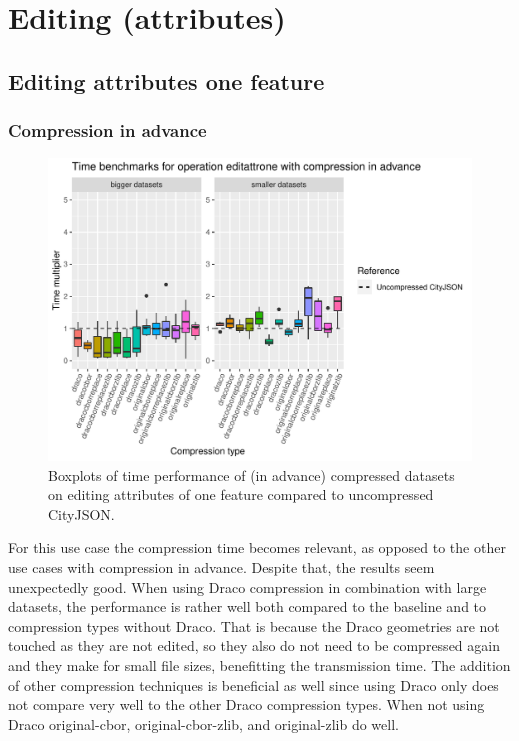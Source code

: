 \newpage

\section{Editing (attributes)}
\label{bmeditingattr}

\subsection{Editing attributes one feature}

\subsubsection{Compression in advance}

\begin{figure}[h!]
    \includegraphics[scale=0.92]{figs/benchmark/individual/editattrone.pdf}
    \caption{Boxplots of time performance of (in advance) compressed datasets on editing attributes of one feature compared to uncompressed CityJSON.}
    \label{fig:sdvis}
\end{figure}

For this use case the compression time becomes relevant, as opposed to the other use cases with compression in advance.
Despite that, the results seem unexpectedly good.
When using Draco compression in combination with large datasets, the performance is rather well both compared to the baseline and to compression types without Draco.
That is because the Draco geometries are not touched as they are not edited, so they also do not need to be compressed again and they make for small file sizes, benefitting the transmission time.
The addition of other compression techniques is beneficial as well since using Draco only does not compare very well to the other Draco compression types.
When not using Draco original-cbor, original-cbor-zlib, and original-zlib do well.

